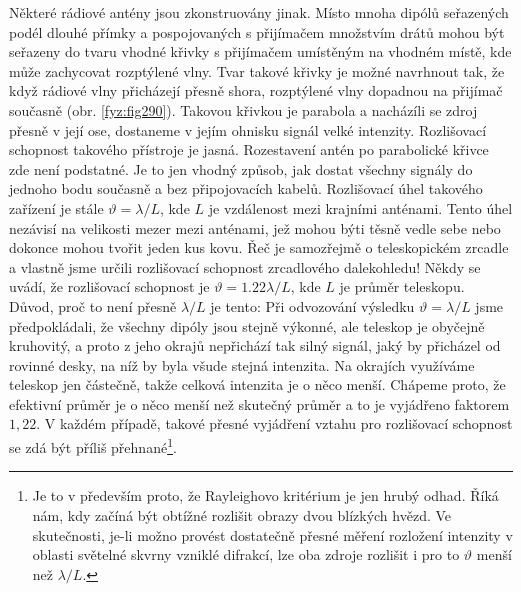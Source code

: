     Některé rádiové antény jsou zkonstruovány jinak. Místo mnoha dipólů seřazených podél dlouhé 
    přímky a pospojovaných s přijímačem množstvím drátů mohou být seřazeny do tvaru vhodné křivky s 
    přijímačem umístěným na vhodném místě, kde může zachycovat rozptýlené vlny. Tvar takové křivky 
    je možné navrhnout tak, že když rádiové vlny přicházejí přesně shora, rozptýlené vlny dopadnou 
    na přijímač současně (obr. \ref{fyz:fig290}). Takovou křivkou je parabola a nacházíli se zdroj 
    přesně v její ose, dostaneme v jejím ohnisku signál velké intenzity. Rozlišovací schopnost 
    takového přístroje je jasná. Rozestavení antén po parabolické křivce zde není podstatné. Je to 
    jen vhodný způsob, jak dostat všechny signály do jednoho bodu současně a bez připojovacích 
    kabelů. Rozlišovací úhel takového zařízení je stále  \(\vartheta =  \lambda/L\), kde \(L\) je 
    vzdálenost mezi krajními anténami. Tento úhel nezávisí na velikosti mezer mezi anténami, jež 
    mohou býti těsně vedle sebe nebo dokonce mohou tvořit jeden kus kovu. Řeč je samozřejmě o 
    teleskopickém zrcadle a vlastně jsme určili rozlišovací schopnost zrcadlového dalekohledu! 
    Někdy se uvádí, že rozlišovací schopnost je \(\vartheta = \num{1.22}\lambda/L\), kde \(L\) je 
    průměr teleskopu. Důvod, proč to není přesně \(\lambda/L\) je tento: Při odvozování výsledku 
    \(\vartheta = \lambda/L\) jsme předpokládali, že všechny dipóly jsou stejně výkonné, ale 
    teleskop je obyčejně kruhovitý, a proto z jeho okrajů nepřichází tak silný signál, jaký by 
    přicházel od rovinné desky, na níž by byla všude stejná intenzita. Na okrajích využíváme 
    teleskop jen částečně, takže celková intenzita je o něco menší. Chápeme proto, že efektivní 
    průměr je o něco menší než skutečný průměr a to je vyjádřeno faktorem \(1,22\). V každém 
    případě, takové přesné vyjádření vztahu pro rozlišovací schopnost se zdá být příliš 
    přehnané\footnote{ Je to v především proto, že Rayleighovo kritérium je jen hrubý odhad. Říká 
    nám, kdy začíná být obtížné rozlišit obrazy dvou blízkých hvězd. Ve skutečnosti, je-li možno 
    provést dostatečně přesné měření rozložení intenzity v oblasti světelné skvrny vzniklé 
    difrakcí, lze oba zdroje rozlišit i pro to \(\vartheta\) menší než \(\lambda/L\).}.
    
